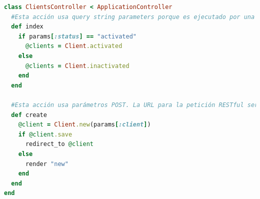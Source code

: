 \begin{lstlisting}[language=Ruby]
class ClientsController < ApplicationController
  #Esta acción usa query string parameters porque es ejecutado por una petición GET de HTML, pero no hace diferencias en la forma de que los parámetros son accedidos. La URL de esta acción con lista ordenada será similar a: clients: /clients?status=activated
  def index
    if params[:status] == "activated"
      @clients = Client.activated
    else
      @clients = Client.inactivated
    end
  end
  
  #Esta acción usa parámetros POST. La URL para la petición RESTful será "/clients" y los datos serán enviados como parte del cuerpo de la petición.
  def create
    @client = Client.new(params[:client])
    if @client.save
      redirect_to @client
    else
      render "new"
    end
  end
end
\end{lstlisting}


